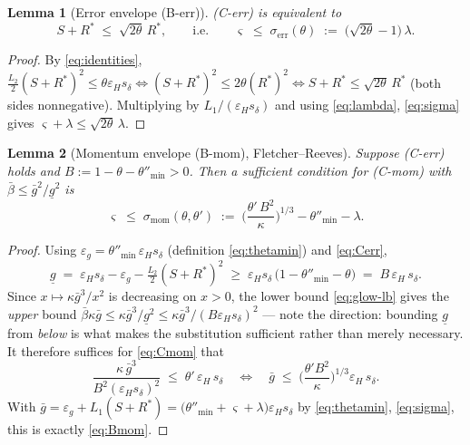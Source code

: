 \documentclass[11pt,a4paper]{article}
\theoremstyle{plain}
\newtheorem{lemma}{Lemma}
\theoremstyle{definition}
\newcommand{\eps}{\varepsilon}
\newcommand{\epsg}{\eps_{g}}
\newcommand{\epsH}{\eps_{H}}
\newcommand{\sdel}{s_{\delta}}
\newcommand{\glow}{\underline{g}}
\newcommand{\Rstar}{R^{*}}
\newcommand{\gup}{\bar g}
\newcommand{\bbeta}{\bar\beta}
\newcommand{\serr}{\sigma_{\mathrm{err}}}
\newcommand{\smom}{\sigma_{\mathrm{mom}}}
\newcommand{\thetamin}{\theta''_{\min}}
\begin{document}
\begin{lemma}[Error envelope (B-err)]\label{lem:Berr}
\emph{(C-err)} is equivalent to
\begin{equation}\label{eq:Berr}
S + \Rstar \;\le\; \sqrt{2\theta}\,\Rstar,
\qquad\text{i.e.}\qquad
\varsigma \;\le\; \serr(\theta) \;:=\; \big(\sqrt{2\theta}-1\big)\,\lambda .
\end{equation}
\end{lemma}

\begin{proof}
By \eqref{eq:identities},
$\tfrac{L_2}{2}(S+\Rstar)^2 \le \theta\epsH\sdel
\iff (S+\Rstar)^2 \le 2\theta(\Rstar)^2
\iff S+\Rstar \le \sqrt{2\theta}\,\Rstar$ (both sides nonnegative).
Multiplying by $L_1/(\epsH\sdel)$ and using \eqref{eq:lambda},
\eqref{eq:sigma} gives $\varsigma+\lambda \le \sqrt{2\theta}\,\lambda$.
\end{proof}

\begin{lemma}[Momentum envelope (B-mom), Fletcher--Reeves]\label{lem:Bmom}
Suppose \emph{(C-err)} holds and $B := 1-\theta-\thetamin > 0$. Then a
sufficient condition for \emph{(C-mom)} with $\bbeta \le \gup^2/\glow^2$ is
\begin{equation}\label{eq:Bmom}
\varsigma \;\le\; \smom(\theta,\theta')
\;:=\; \Big(\frac{\theta'\,B^2}{\kappa}\Big)^{1/3} - \thetamin - \lambda .
\end{equation}
\end{lemma}

\begin{proof}
Using $\epsg = \thetamin\,\epsH\sdel$ (definition \eqref{eq:thetamin}) and
\eqref{eq:Cerr},
\begin{equation}\label{eq:glow-lb}
\glow \;=\; \epsH\sdel - \epsg - \tfrac{L_2}{2}(S+\Rstar)^2
\;\ge\; \epsH\sdel\,\big(1 - \thetamin - \theta\big)
\;=\; B\,\epsH\,\sdel .
\end{equation}
Since $x \mapsto \kappa\gup^3/x^2$ is decreasing on $x>0$, the lower bound
\eqref{eq:glow-lb} gives the \emph{upper} bound
$\bbeta\kappa\gup \le \kappa\gup^3/\glow^2 \le
\kappa\gup^3/(B\epsH\sdel)^2$ --- note the direction: bounding $\glow$
from \emph{below} is what makes the substitution sufficient rather than
merely necessary. It therefore suffices for \eqref{eq:Cmom} that
\[
\frac{\kappa\,\gup^3}{B^2(\epsH\sdel)^2} \;\le\; \theta'\,\epsH\,\sdel
\quad\Longleftrightarrow\quad
\gup \;\le\; \Big(\frac{\theta' B^2}{\kappa}\Big)^{1/3}\epsH\,\sdel .
\]
With $\gup = \epsg + L_1(S+\Rstar) =
\big(\thetamin + \varsigma + \lambda\big)\epsH\sdel$ by \eqref{eq:thetamin},
\eqref{eq:sigma}, this is exactly \eqref{eq:Bmom}.
\end{proof}
\end{document}
